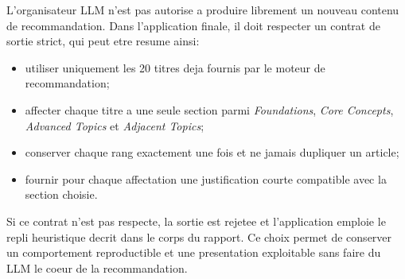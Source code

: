 L'organisateur LLM n'est pas autorise a produire librement un nouveau contenu
de recommandation. Dans l'application finale, il doit respecter un contrat de
sortie strict, qui peut etre resume ainsi:
\begin{itemize}
    \item utiliser uniquement les 20 titres deja fournis par le moteur de
    recommandation;
    \item affecter chaque titre a une seule section parmi
    \textit{Foundations}, \textit{Core Concepts}, \textit{Advanced Topics} et
    \textit{Adjacent Topics};
    \item conserver chaque rang exactement une fois et ne jamais dupliquer un
    article;
    \item fournir pour chaque affectation une justification courte compatible
    avec la section choisie.
\end{itemize}

Si ce contrat n'est pas respecte, la sortie est rejetee et l'application
emploie le repli heuristique decrit dans le corps du rapport. Ce choix permet
de conserver un comportement reproductible et une presentation exploitable sans
faire du LLM le coeur de la recommandation.
